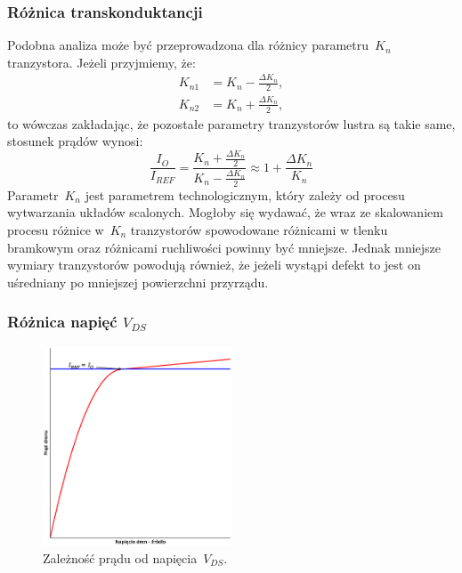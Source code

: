 \documentclass[twoside,pl,final]{labman}
\begin{document}
\subsubsection{Różnica transkonduktancji}
\label{baisc:matching:kp}
Podobna analiza może być przeprowadzona dla różnicy parametru~$K_n$ tranzystora.
Jeżeli przyjmiemy, że:
\begin{align}
  K_{n1} &= K_n - \frac{\Delta K_n}{2}, \nonumber \\
  K_{n2} &= K_n + \frac{\Delta K_n}{2},
\end{align}
to wówczas zakładając, że pozostałe parametry tranzystorów lustra
są takie same, stosunek prądów wynosi:
\begin{equation}
  \frac{I_O}{I_{REF}} = \frac{K_n + \frac{\Delta K_n}{2}}
    {K_n - \frac{\Delta K_n}{2}} \approx
    1 + \frac{\Delta K_n}{K_n}
  \label{eqn:matching:kp}
\end{equation}
Parametr~$K_n$ jest parametrem technologicznym,
który zależy od procesu wytwarzania układów scalonych.
Mogłoby się wydawać, że wraz ze skalowaniem procesu różnice w~$K_n$
tranzystorów spowodowane różnicami w tlenku bramkowym oraz
różnicami ruchliwości powinny być mniejsze.
Jednak mniejsze wymiary tranzystorów powodują również,
że jeżeli wystąpi defekt to jest on uśredniany
po mniejszej powierzchni przyrządu.

\subsubsection{Różnica napięć $V_{DS}$}
\label{matching:vds}

\begin{figure}[!htbp]
  \centering
  \includegraphics[width=0.5\textwidth]{matching_vds}
  \caption{Zależność prądu od napięcia~$V_{DS}$.}
  \label{fig:matching:vds}
\end{figure}
\end{document}
